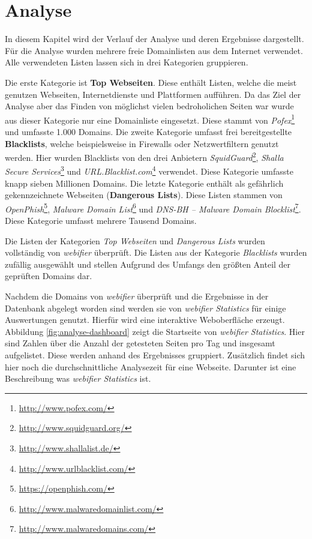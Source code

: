 \chapter{Analyse}
\label{cha:analyse}

In diesem Kapitel wird der Verlauf der Analyse und deren Ergebnisse dargestellt. Für die Analyse wurden mehrere freie Domainlisten aus dem Internet verwendet. Alle verwendeten Listen lassen sich in drei Kategorien gruppieren.

Die erste Kategorie ist \textbf{Top Webseiten}. Diese enthält Listen, welche die meist genutzen Webseiten, Internetdienste und Plattformen aufführen. Da das Ziel der Analyse aber das Finden von möglichst vielen bedroholichen Seiten war wurde aus dieser Kategorie nur eine Domainliste eingesetzt. Diese stammt von \textit{Pofex}\footnote{\url{http://www.pofex.com/}} und umfasste 1.000 Domains. Die zweite Kategorie umfasst frei bereitgestellte \textbf{Blacklists}, welche beispielsweise in Firewalls oder Netzwertfiltern genutzt werden. Hier wurden Blacklists von den drei Anbietern \textit{SquidGuard}\footnote{\url{http://www.squidguard.org/}}, \textit{Shalla Secure Services}\footnote{\url{http://www.shallalist.de/}} und \textit{URL.Blacklist.com}\footnote{\url{http://www.urlblacklist.com/}} verwendet. Diese Kategorie umfasste knapp sieben Millionen Domains. Die letzte Kategorie enthält als gefährlich gekennzeichnete Webseiten (\textbf{Dangerous Lists}). Diese Listen stammen von \textit{OpenPhish}\footnote{\url{https://openphish.com/}}, \textit{Malware Domain List}\footnote{\url{http://www.malwaredomainlist.com/}} und \textit{DNS-BH – Malware Domain Blocklist}\footnote{\url{http://www.malwaredomains.com/}}. Diese Kategorie umfasst mehrere Tausend Domains.

Die Listen der Kategorien \textit{Top Webseiten} und \textit{Dangerous Lists} wurden vollständig von \textit{webifier} überprüft. Die Listen aus der Kategorie \textit{Blacklists} wurden zufällig ausgewählt und stellen Aufgrund des Umfangs den größten Anteil der geprüften Domains dar.

Nachdem die Domains von \textit{webifier} überprüft und die Ergebnisse in der Datenbank abgelegt worden sind werden sie von \textit{webifier Statistics} für einige Auswertungen genutzt. Hierfür wird eine interaktive Weboberfläche erzeugt. Abbildung \ref{fig:analyse-dashboard} zeigt die Startseite von \textit{webifier Statistics}. Hier sind Zahlen über die Anzahl der getesteten Seiten pro Tag und insgesamt aufgelistet. Diese werden anhand des Ergebnisses gruppiert. Zusätzlich findet sich hier noch die durchschnittliche Analysezeit für eine Webseite. Darunter ist eine Beschreibung was \textit{webifier Statistics} ist.

